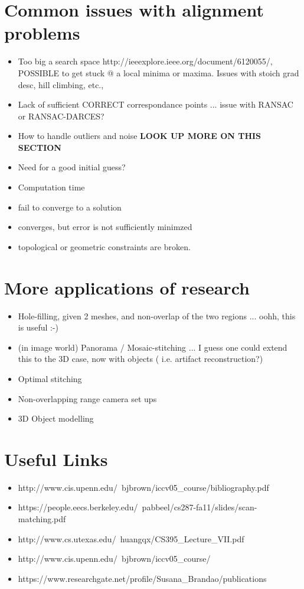 \documentclass{article}
\begin{document}
\section{Common issues with alignment problems}
\begin{itemize}
	\item Too big a search space http://ieeexplore.ieee.org/document/6120055/, POSSIBLE to get stuck @ a local minima or maxima. Issues with stoich grad desc, hill climbing, etc., 
	\item Lack of sufficient CORRECT correspondance points ... issue with RANSAC or RANSAC-DARCES?
	\item How to handle outliers and noise \textbf{LOOK UP MORE ON THIS SECTION}
	\item Need for a good initial guess?
	\item Computation time
	\item fail to converge to a solution
	\item converges, but error is not sufficiently minimzed
	\item topological or geometric constraints are broken. 
\end{itemize}

\section{More applications of research}
\begin{itemize}
	\item Hole-filling, given 2 meshes, and non-overlap of the two regions ... oohh, this is useful :-) 
	\item (in image world) Panorama / Mosaic-stitching ... I guess one could extend this to the 3D case, now with objects ( i.e. artifact reconstruction?)
	\item Optimal stitching
	\item  Non-overlapping range camera set ups
	\item 3D Object modelling
\end{itemize}

\section{Useful Links}
\begin{itemize}
	\item http://www.cis.upenn.edu/~bjbrown/iccv05\_course/bibliography.pdf
	\item https://people.eecs.berkeley.edu/~pabbeel/cs287-fa11/slides/scan-matching.pdf
	\item http://www.cs.utexas.edu/~huangqx/CS395\_Lecture\_VII.pdf
	\item http://www.cis.upenn.edu/~bjbrown/iccv05\_course/
	\item https://www.researchgate.net/profile/Susana_Brandao/publications
\end{itemize}
\end{document}
